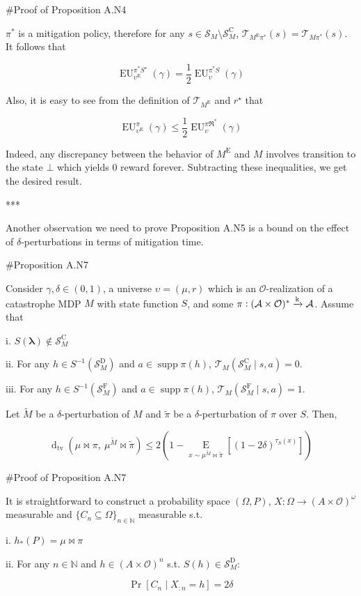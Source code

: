 \documentclass[a4paper]{article}
\DeclareMathOperator{\Supp}{supp}
\newcommand{\AP}[1]{\left(#1\right)}
\newcommand{\AB}[1]{\left[#1\right]}
\newcommand{\Pa}[2]{\underset{#1}{\operatorname{Pr}}\AB{#2}}
\newcommand{\Ea}[2]{\underset{#1}{\operatorname{E}}\AB{#2}}
\newcommand{\Dtva}[1]{\operatorname{d}_{\text{tv}}\AP{#1}}
\newcommand{\Nats}{\mathbb{N}}
\newcommand{\Sq}[2]{\{#1\}_{#2 \in \Nats}}
\newcommand{\Sqn}[1]{\Sq{#1}{n}}
\newcommand{\Estr}{\boldsymbol{\lambda}}
\newcommand{\M}{\xrightarrow{\textnormal{k}}}
\newcommand{\Ob}{\mathcal{O}}
\newcommand{\A}{\mathcal{A}}
\newcommand{\St}{\mathcal{S}}
\newcommand{\T}{\mathcal{T}}
\newcommand{\FH}{(\A \times \Ob)^*}
\newcommand{\RMC}{\mathrm{C}}
\newcommand{\RMD}{\mathrm{D}}
\newcommand{\RME}{\mathrm{E}}
\newcommand{\RMF}{\mathrm{F}}
\newcommand{\SF}{\St^{\RMF}}
\newcommand{\SD}{\St^{\RMD}}
\newcommand{\SC}{\St^{\RMC}}
\newcommand{\ME}{M^{\RME}}
\newcommand{\EU}{\operatorname{EU}}
\begin{document}
\#Proof of Proposition A.N4

$\pi^*$ is a mitigation policy, therefore for any $s \in \St_M \setminus \SC_M$, $\T_{\ME\pi^*}(s)=\T_{M\pi^*}(s)$. It follows that 

$$\EU_{\upsilon^\RME}^{\pi^* S^\star}(\gamma) = \frac{1}{2}\EU_{\upsilon}^{\pi^* S}(\gamma)$$

Also, it is easy to see from the definition of $\T_{\ME}$ and $r^\star$ that

$$\EU_{\upsilon^\RME}^{\pi}(\gamma) \leq \frac{1}{2}\EU_{\upsilon}^{\pi\Re^*}(\gamma)$$

Indeed, any discrepancy between the behavior of $\ME$ and $M$ involves transition to the state $\bot$ which yields 0 reward forever. Subtracting these inequalities, we get the desired result.

***

Another observation we need to prove Proposition A.N5 is a bound on the effect of $\delta$-perturbations in terms of mitigation time.

\#Proposition A.N7

Consider $\gamma,\delta\in(0,1)$, a universe $\upsilon=(\mu,r)$ which is an $\Ob$-realization of a catastrophe MDP $M$ with state function $S$, and some $\pi: \FH \M \A$. Assume that 

i. $S(\Estr) \not\in \SC_M$

ii. For any $h \in S^{-1}\AP{\SD_M}$ and $a \in \Supp{\pi(h)}$, $\T_M\AP{\SC_M \mid s,a} = 0$.

iii. For any $h \in S^{-1}\AP{\SF_M}$ and $a \in \Supp{\pi(h)}$, $\T_M\AP{\SF_M \mid s,a} = 1$. 

Let $\tilde{M}$ be a $\delta$-perturbation of $M$ and $\tilde{\pi}$ be a $\delta$-perturbation of $\pi$ over $S$. Then,

$$\Dtva{\mu\bowtie\pi,\ \mu^{\tilde{M}}\bowtie\tilde{\pi}} \leq 2\AP{1-\Ea{x\sim\mu^{\tilde{M}}\bowtie\tilde{\pi}}{\AP{1-2\delta}^{\tau_S(x)}}}$$

\#Proof of Proposition A.N7

It is straightforward to construct a probability space $(\Omega,P)$, $X: \Omega \rightarrow (A \times \Ob)^\omega$ measurable and $\Sqn{C_n \subseteq \Omega}$ measurable s.t.

i. $h_*(P) = \mu\bowtie\pi$

ii. For any $n \in \Nats$ and $h \in (A \times \Ob)^n$ s.t. $S(h) \in \SD_M$: 

$$\Pa{}{C_n \mid X_{:n} = h} = 2\delta$$
\end{document}
